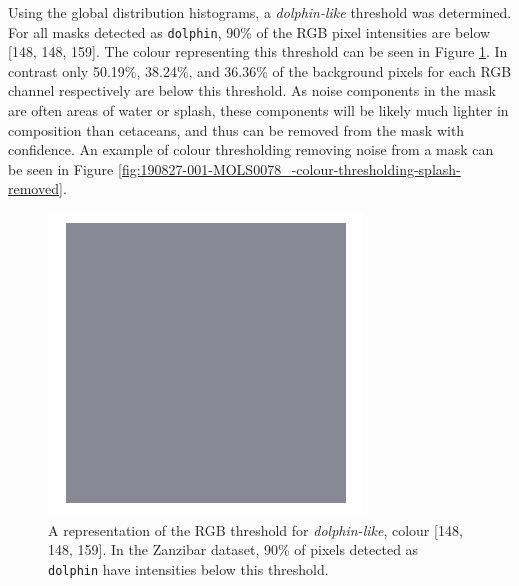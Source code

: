 Using the global distribution histograms, a \textit{dolphin-like} threshold was determined. For all masks detected as \texttt{dolphin}, 90\% of the RGB pixel intensities are below [148, 148, 159]. The colour representing this threshold can be seen in Figure \ref{fig:colour-threshold}. In contrast only 50.19\%, 38.24\%, and 36.36\% of the background pixels for each RGB channel respectively are below this threshold. As noise components in the mask are often areas of water or splash, these components will be likely much lighter in composition than cetaceans, and thus can be removed from the mask with confidence. An example of colour thresholding removing noise from a mask can be seen in Figure \ref{fig:190827-001-MOLS0078_-colour-thresholding-splash-removed}.

\begin{figure}
	\begin{center}
		\includegraphics[scale=0.3]{Chapter3/figs/148-148-159.png}
	\end{center}
	\caption[A representation of the RGB threshold for \textit{dolphin-like}, colour {[}148, 148, 159{]}.]{A representation of the RGB threshold for \textit{dolphin-like}, colour {[}148, 148, 159{]}. In the Zanzibar dataset, 90\% of pixels detected as \texttt{dolphin} have intensities below this threshold.}\label{fig:colour-threshold}
\end{figure}

